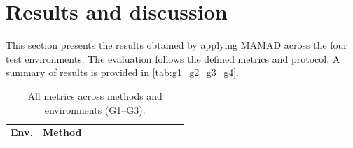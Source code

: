 \documentclass[pdflatex,sn-mathphys-num]{sn-jnl}%
\theoremstyle{thmstyleone}%
\theoremstyle{thmstyletwo}%
\theoremstyle{thmstylethree}%
\begin{document}
\section{Results and discussion} \label{sec:results}

This section presents the results obtained by applying MAMAD across the four test environments. The evaluation follows the defined metrics and protocol. A summary of results is provided in \autoref{tab:g1_g2_g3_g4}.

\medskip

\begin{table}[h!]
    \centering
    \caption{All metrics across methods and environments (G1--G3).}
    \footnotesize
    \begin{tabular}{p{0.5cm}|p{1cm}|p{0.4cm}p{0.3cm}p{0.3cm}p{0.85cm}|p{0.4cm}p{0.4cm}p{0.55cm}|p{0.8cm}p{0.8cm}p{0.8cm}}
        \hline
        \textbf{Env.} & \textbf{Method}

        
        
        
        
        
        
        
        
        
        
        
        
        
        
        
        
        
        
        
        
        
        
        
        
        
        
        
        
        
        
        
        
        
        
        
        
        
        
        
        
        
        
        
        
        
        
        
        
        
        
        
        
        
        
        
        

\end{tabular}
\end{table}
\end{document}
